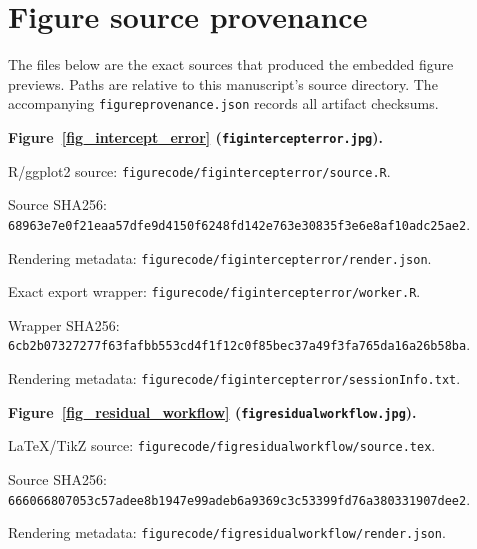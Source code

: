 \documentclass[11pt]{article}
\begin{document}
\section*{Figure source provenance}
The files below are the exact sources that produced the embedded figure previews. Paths are relative to this manuscript's source directory. The accompanying \texttt{figureprovenance.json} records all artifact checksums.\par
\medskip\noindent\textbf{Figure~\ref{fig_intercept_error} (\texttt{figintercepterror.jpg}).}\par
\noindent R/ggplot2 source: \texttt{figurecode/\allowbreak{}figintercepterror/\allowbreak{}source.R}.\par
\noindent Source SHA256: \texttt{68963e7e\allowbreak{}0f21eaa5\allowbreak{}7dfe9d41\allowbreak{}50f6248f\allowbreak{}d142e763\allowbreak{}e30835f3\allowbreak{}e6e8af10\allowbreak{}adc25ae2}.\par
\noindent Rendering metadata: \texttt{figurecode/\allowbreak{}figintercepterror/\allowbreak{}render.json}.\par
\noindent Exact export wrapper: \texttt{figurecode/\allowbreak{}figintercepterror/\allowbreak{}worker.R}.\par
\noindent Wrapper SHA256: \texttt{6cb2b073\allowbreak{}27277f63\allowbreak{}fafbb553\allowbreak{}cd4f1f12\allowbreak{}c0f85bec\allowbreak{}37a49f3f\allowbreak{}a765da16\allowbreak{}a26b58ba}.\par
\noindent Rendering metadata: \texttt{figurecode/\allowbreak{}figintercepterror/\allowbreak{}sessionInfo.txt}.\par
\medskip\noindent\textbf{Figure~\ref{fig_residual_workflow} (\texttt{figresidualworkflow.jpg}).}\par
\noindent LaTeX/TikZ source: \texttt{figurecode/\allowbreak{}figresidualworkflow/\allowbreak{}source.tex}.\par
\noindent Source SHA256: \texttt{66606680\allowbreak{}7053c57a\allowbreak{}dee8b194\allowbreak{}7e99adeb\allowbreak{}6a9369c3\allowbreak{}c53399fd\allowbreak{}76a38033\allowbreak{}1907dee2}.\par
\noindent Rendering metadata: \texttt{figurecode/\allowbreak{}figresidualworkflow/\allowbreak{}render.json}.\par
\end{document}
